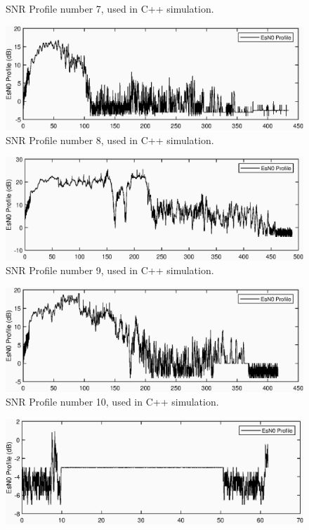 \begin{appendices}
\begin{figure}[ht!]
\caption{SNR Profile number 7, used in C++ simulation.}
\end{figure}
\begin{figure}[ht!]
\includegraphics{figures/c_sim_snr/EsNo_profile_8.eps}
\caption{SNR Profile number 8, used in C++ simulation.}
\end{figure}
\begin{figure}[ht!]
\includegraphics{figures/c_sim_snr/EsNo_profile_9.eps}
\caption{SNR Profile number 9, used in C++ simulation.}
\end{figure}
\begin{figure}[ht!]
\includegraphics{figures/c_sim_snr/EsNo_profile_10.eps}
\caption{SNR Profile number 10, used in C++ simulation.}
\end{figure}
\begin{figure}[ht!]
\includegraphics{figures/c_sim_snr/EsNo_profile_11.eps}

\end{figure}
\end{appendices}
